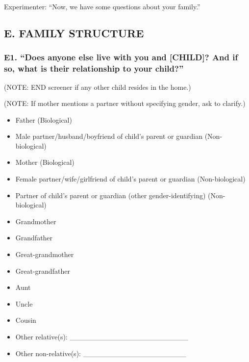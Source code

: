 \documentclass[
  12pt,
]{book}
\providecommand{\tightlist}{%
  \setlength{\itemsep}{0pt}\setlength{\parskip}{0pt}}
\begin{document}
Experimenter: ``Now, we have some questions about your family.''

\hypertarget{e.-family-structure}{%
\subsection*{E. FAMILY STRUCTURE}\label{e.-family-structure}}

\hypertarget{e1.-does-anyone-else-live-with-you-and-child-and-if-so-what-is-their-relationship-to-your-child}{%
\subsubsection*{E1. ``Does anyone else live with you and {[}CHILD{]}? And if so, what is their relationship to your child?''}\label{e1.-does-anyone-else-live-with-you-and-child-and-if-so-what-is-their-relationship-to-your-child}}

(NOTE: END screener if any other child resides in the home.)

(NOTE: If mother mentions a partner without specifying gender, ask to clarify.)

\begin{itemize}
\tightlist
\item
  Father (Biological)
\item
  Male partner/husband/boyfriend of child's parent or guardian (Non-biological)
\item
  Mother (Biological)
\item
  Female partner/wife/girlfriend of child's parent or guardian (Non-biological)
\item
  Partner of child's parent or guardian (other gender-identifying) (Non- biological)
\item
  Grandmother
\item
  Grandfather
\item
  Great-grandmother
\item
  Great-grandfather
\item
  Aunt
\item
  Uncle
\item
  Cousin
\item
  Other relative(s): \_\_\_\_\_\_\_\_\_\_\_\_\_\_\_\_\_\_\_\_\_\_\_
\item
  Other non-relative(s): \_\_\_\_\_\_\_\_\_\_\_\_\_\_\_\_\_\_\_\_
\end{itemize}
\end{document}
